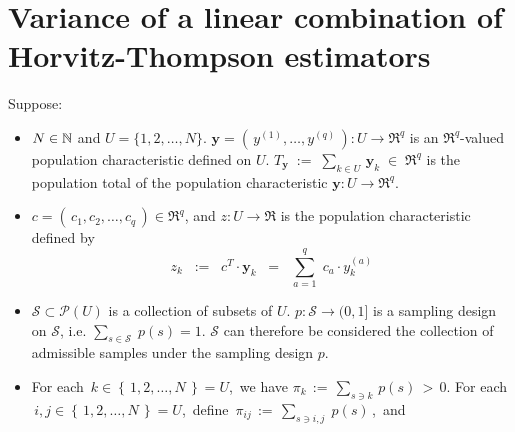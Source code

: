 

\section{Variance of a linear combination of Horvitz-Thompson estimators}
\setcounter{theorem}{0}
\setcounter{equation}{0}


\renewcommand{\theenumi}{\roman{enumi}}
\renewcommand{\labelenumi}{\textnormal{(\theenumi)}$\;\;$}


\begin{proposition}
\mbox{}
\vskip 0.15cm
\noindent
Suppose:
\begin{itemize}
\item
	$N \in \mathbb{N}$ and $U = \{1,2,\ldots,N\}$.
	\vskip 0.05cm
	$\mathbf{y} = \left(\,y^{(1)},\ldots,y^{(q)}\,\right) : U \longrightarrow \Re^{q}$
	is an $\Re^{q}$-valued population characteristic defined on $U$.
	\vskip 0.05cm
	$T_{\mathbf{y}} \; := \; \underset{k \in U}{\sum}\,\mathbf{y}_{k} \; \in \; \Re^{q}$ is the population total
	of the population characteristic $\mathbf{y} : U \longrightarrow \Re^{q}$.
\item
	$c = \left(\,c_{1}, c_{2}, \ldots, c_{q}\,\right) \in \Re^{q}$, and
	$z : U \longrightarrow \Re$ is the population characteristic defined by
	\begin{equation*}
	z_{k}
	\;\; := \;\;
		c^{T} \cdot \mathbf{y}_{k}
	\;\; = \;\;
		\overset{q}{\underset{a=1}{\sum}}\; c_{a} \cdot y^{(a)}_{k}
	\end{equation*}
\item
	$\mathcal{S} \subset \mathcal{P}(U)$ is a collection of subsets of $U$.
	$p : \mathcal{S} \longrightarrow (0,1]$ is a sampling design on $\mathcal{S}$,
	i.e. $\underset{s\in\mathcal{S}}{\sum}\;p(s) = 1$.
	\vskip 0.05cm
	$\mathcal{S}$ can therefore be considered the collection of admissible samples under the sampling design $p$.
\item
	For each \,$k \in \left\{\,1,2,\ldots,N\,\right\} = U$,\, we have
	$\pi_{k} \,:=\, \underset{s \ni k}{\sum}\,p(s) \,>\, 0$.
	\vskip 0.05cm
	For each \,$i,j \in \left\{\,1,2,\ldots,N\,\right\} = U$,\, define
	\,$\pi_{ij} \, := \, \underset{s \ni i,j}{\sum}\;p(s)$\,,\, and

\end{itemize}
\end{proposition}
